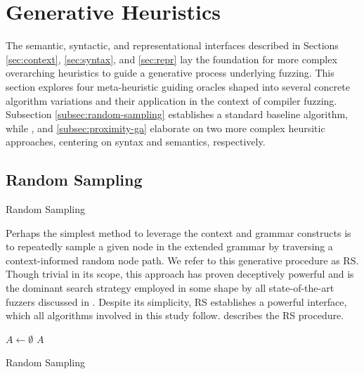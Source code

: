 \section{\label{sec:heuristics}Generative Heuristics}

The semantic, syntactic, and representational interfaces
described in Sections \ref{sec:context}, \ref{sec:syntax}, and \ref{sec:repr}
lay the foundation for more complex overarching heuristics
to guide a generative process underlying fuzzing.
This section explores four meta-heuristic guiding oracles shaped into
several concrete algorithm variations and their application
in the context of compiler fuzzing.
Subsection \ref{subsec:random-sampling} establishes a standard baseline algorithm,
while , and \ref{subsec:proximity-ga}
elaborate on two more complex heursitic approaches,
centering on syntax and semantics, respectively.

\subsection{\label{subsec:random-sampling} Random Sampling}

 {Random Sampling}

Perhaps the simplest method to leverage the context and grammar constructs
is to repeatedly sample a given node in the extended grammar by traversing a
context-informed random node path.
We refer to this generative procedure as \Gls{RS}.
Though trivial in its scope, this approach has proven deceptively powerful
and is the dominant search strategy employed in some shape by all state-of-the-art
fuzzers discussed in .
Despite its simplicity, \gls{RS} establishes a powerful interface, which
all algorithms involved in this study follow.
 describes the \gls{RS} procedure.

\begin{algorithm}

	\BlankLine
	\DontPrintSemicolon
	$A \gets \emptyset$\;
	\Return $A$\;

	\caption{Random Sampling}
	\label{alg:rs}
\end{algorithm}


